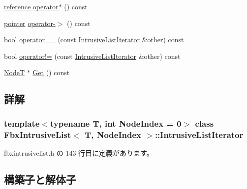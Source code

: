 \begin{DoxyCompactItemize}
\hyperlink{class_fbx_intrusive_list_aa927f048081371fe74dff673d3a5a8ad}{reference} \hyperlink{class_fbx_intrusive_list_1_1_intrusive_list_iterator_aaeb3fe3d4aa1bb369c982a86874bead7}{operator$\ast$} () const
\item 
\hyperlink{class_fbx_intrusive_list_ad04ad10d67ddd0d4104b172839c908d7}{pointer} \hyperlink{class_fbx_intrusive_list_1_1_intrusive_list_iterator_ad699b071c709f496ca56d77c463d6a3a}{operator-\/$>$} () const
\item 
bool \hyperlink{class_fbx_intrusive_list_1_1_intrusive_list_iterator_a5d1689422d59c3ed59daeacb687b7a24}{operator==} (const \hyperlink{class_fbx_intrusive_list_1_1_intrusive_list_iterator}{Intrusive\+List\+Iterator} \&other) const
\item 
bool \hyperlink{class_fbx_intrusive_list_1_1_intrusive_list_iterator_a2b302e93dfb6cff66399273730d24c84}{operator!=} (const \hyperlink{class_fbx_intrusive_list_1_1_intrusive_list_iterator}{Intrusive\+List\+Iterator} \&other) const
\item 
\hyperlink{class_fbx_intrusive_list_a6ffda382a6d029a042cbb0110853680c}{NodeT} $\ast$ \hyperlink{class_fbx_intrusive_list_1_1_intrusive_list_iterator_ae4510214381d82038e1b2c37cd3f0c20}{Get} () const
\end{DoxyCompactItemize}


\subsection{詳解}
\subsubsection*{template$<$typename T, int Node\+Index = 0$>$\newline
class Fbx\+Intrusive\+List$<$ T, Node\+Index $>$\+::\+Intrusive\+List\+Iterator}



 fbxintrusivelist.\+h の 143 行目に定義があります。



\subsection{構築子と解体子}
\mbox{\label{class_fbx_intrusive_list_1_1_intrusive_list_iterator_a69f65667269661a51103f7c8bc8bffac}} 
